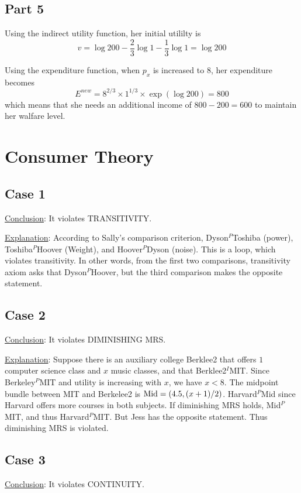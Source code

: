 \documentclass{article}
\begin{document}
\subsection{Part 5}
Using the indirect utility function, her initial utililty is
\begin{equation*}
	v=\log200-\frac{2}{3}\log1-\frac{1}{3}\log1=\log200
\end{equation*}

Using the expenditure function, when $p_x$ is increased to $8$, her expenditure becomes
\begin{equation*}
	E^{new}=8^{2/3}\times1^{1/3}\times\exp(\log200)=800
\end{equation*}
which means that she needs an additional income of $800-200=600$ to maintain her walfare level.

\section{Consumer Theory}
\subsection{Case 1}
\noindent\underline{Conclusion}: It violates TRANSITIVITY.

\noindent\underline{Explanation}: According to Sally's comparison criterion, Dyson$^P$Toshiba (power), Toshiba$^P$Hoover (Weight), and Hoover$^P$Dyson (noise). This is a loop, which violates transitivity. In other words, from the first two comparisons, transitivity axiom asks that Dyson$^P$Hoover, but the third comparison makes the opposite statement.

\subsection{Case 2}
\noindent\underline{Conclusion}: It violates DIMINISHING MRS.

\noindent\underline{Explanation}: Suppose there is an auxiliary college Berklee2 that offers $1$ computer science class and $x$ music classes, and that Berklee2$^I$MIT. Since Berkeley$^P$MIT and utility is increasing with $x$, we have $x<8$. The midpoint bundle between MIT and Berkelee2 is $\textup{Mid}=(4.5,(x+1)/2)$. Harvard$^P$Mid since Harvard offers more courses in both subjects. If diminishing MRS holds, Mid$^P$MIT, and thus Harvard$^P$MIT. But Jess has the opposite statement. Thus diminishing MRS is violated.

\subsection{Case 3}
\noindent\underline{Conclusion}: It violates CONTINUITY.
\end{document}
